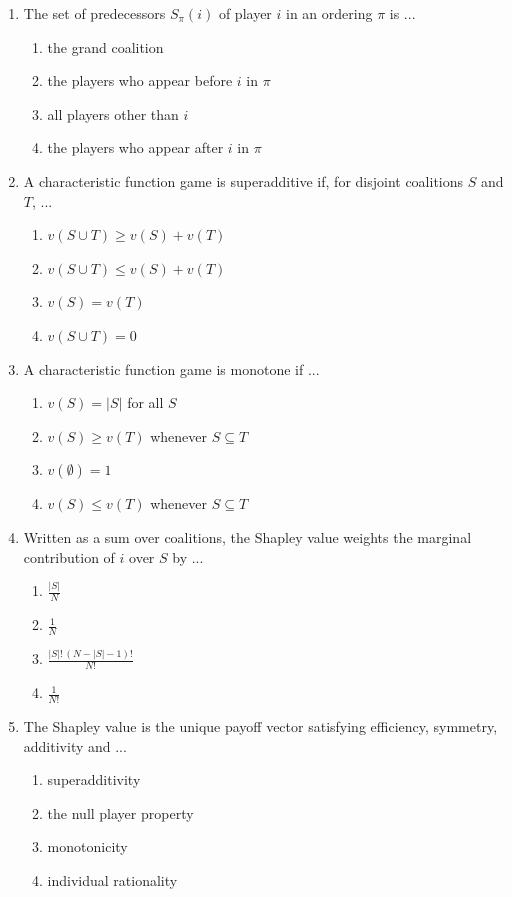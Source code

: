 \documentclass[11pt]{article}
\begin{document}
\begin{enumerate}[itemsep=6pt]
  \begin{enumerate}
    \item the Shapley value of \(S\)
    \item the worth that coalition \(S\) can secure on its own
    \item the payoff to a single player
    \item the number of players in \(S\)
  \end{enumerate}
  \item The set of predecessors \(S_\pi(i)\) of player \(i\) in an ordering \(\pi\) is ...
  \begin{enumerate}
    \item the grand coalition
    \item the players who appear before \(i\) in \(\pi\)
    \item all players other than \(i\)
    \item the players who appear after \(i\) in \(\pi\)
  \end{enumerate}
  \item A characteristic function game is superadditive if, for disjoint coalitions \(S\) and \(T\), ...
  \begin{enumerate}
    \item \(v(S \cup T) \ge v(S) + v(T)\)
    \item \(v(S \cup T) \le v(S) + v(T)\)
    \item \(v(S) = v(T)\)
    \item \(v(S \cup T) = 0\)
  \end{enumerate}
  \item A characteristic function game is monotone if ...
  \begin{enumerate}
    \item \(v(S) = |S|\) for all \(S\)
    \item \(v(S) \ge v(T)\) whenever \(S \subseteq T\)
    \item \(v(\emptyset) = 1\)
    \item \(v(S) \le v(T)\) whenever \(S \subseteq T\)
  \end{enumerate}
  \item Written as a sum over coalitions, the Shapley value weights the marginal contribution of \(i\) over \(S\) by ...
  \begin{enumerate}
    \item \(\frac{|S|}{N}\)
    \item \(\frac{1}{N}\)
    \item \(\frac{|S|!\,(N-|S|-1)!}{N!}\)
    \item \(\frac{1}{N!}\)
  \end{enumerate}
  \item The Shapley value is the unique payoff vector satisfying efficiency, symmetry, additivity and ...
  \begin{enumerate}
    \item superadditivity
    \item the null player property
    \item monotonicity
    \item individual rationality
  \end{enumerate}
\end{enumerate}
\end{document}
